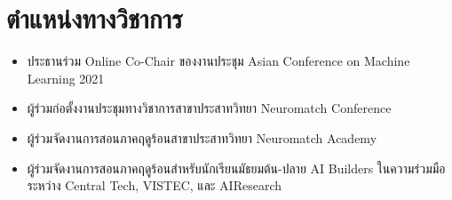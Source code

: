 \section{\sc ตำแหน่งทางวิชาการ}

\begin{itemize}[leftmargin=0cm, label={}]
\itemsep0em

\item ประธานร่วม Online Co-Chair ของงานประชุม Asian Conference on Machine Learning 2021

\item ผู้ร่วมก่อตั้งงานประชุมทางวิชาการสาขาประสาทวิทยา Neuromatch Conference

\item ผู้ร่วมจัดงานการสอนภาคฤดูร้อนสาขาประสาทวิทยา Neuromatch Academy

\item ผู้ร่วมจัดงานการสอนภาคฤดูร้อนสำหรับนักเรียนมัธยมต้น-ปลาย AI Builders ในความร่วมมือระหว่าง Central Tech, VISTEC, และ AIResearch

\end{itemize}
